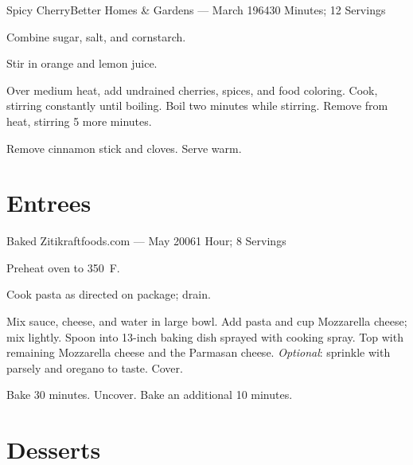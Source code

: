 \documentclass{article}
\begin{document}
\begin{recipe}{Spicy Cherry}{Better Homes \& Gardens --- March 1964}{30 Minutes; 12 Servings}

   Combine sugar, salt, and cornstarch.

   Stir in orange and lemon juice.

   Over medium heat, add undrained cherries, spices, and food coloring.  Cook,
   stirring constantly until boiling.  Boil two minutes while stirring.  Remove
   from heat, stirring 5 more minutes.

   \freeform
   Remove cinnamon stick and cloves.  Serve warm.

\end{recipe}

\section{Entrees}

\begin{recipe}{Baked Ziti}{kraftfoods.com --- May 2006}{1 Hour; 8 Servings}

   \newstep
   Preheat oven to 350\ \0F.

   Cook pasta as directed on package; drain.

   Mix sauce, cheese, and water in large bowl.  Add pasta and  cup
   Mozzarella cheese; mix lightly.  Spoon into 13-inch baking dish sprayed
   with cooking spray.  Top with remaining Mozzarella cheese and the Parmasan
   cheese.  \emph{Optional}: sprinkle with parsely and oregano to taste.  Cover.

   \newstep
   Bake 30 minutes. Uncover.  Bake an additional 10 minutes.

\end{recipe}

\section{Desserts}
\end{document}
